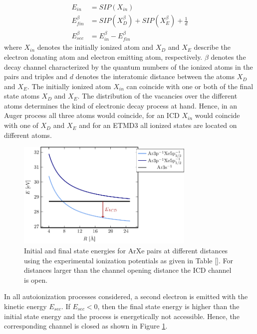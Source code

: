 \begin{align}
 E_{in}        &= SIP(X_{in}) \label{equation:E_in}\\
 E_{fin}^\beta &= SIP(X_{D}^\beta) + SIP(X_{E}^\beta) + \frac 1d
           \label{equation:E_fin}\\
 E_{sec}^\beta &= E_{in}^\beta - E_{fin}^\beta \label{equation:E_sec}
\end{align}
where $X_{in}$ denotes the initially ionized atom and
$X_{D}$ and $X_{E}$ describe the electron donating atom and electron
emitting atom, respectively.
$\beta$ denotes the decay channel characterized
by the quantum numbers of the ionized atoms in the pairs
and triples and $d$ denotes the interatomic distance between the atoms
$X_{D}$ and $X_{E}$. The initially ionized atom $X_{in}$ can
coincide with one or both of
the final state atoms
$X_{D}$ and $X_{E}$.
The distribution of the vacancies over the different
atoms determines the kind of electronic decay process at hand. Hence, in an
Auger process all three atoms would coincide, for an ICD $X_{in}$
would coincide with one of $X_{D}$ and $X_{E}$ and for an {ETMD}3
all ionized states are located on different atoms.

\begin{figure}[h]
 \centering
 \includegraphics[width=8.5cm]{pics/channel_open_ICD.pdf}
 \caption{Initial and final state energies for ArXe pairs at different
          distances using the experimental ionization potentials as given
          in Table \ref{}. For distances larger than the channel opening
          distance the ICD channel is open.}
 \label{figure:channel_open_ICD}
\end{figure}

In all autoionization processes considered, a second electron
is emitted with the kinetic energy $E_{sec}$. If $E_{sec}<0$, then
the final state energy is higher than the initial state energy and the        
process is energetically not accessible. Hence, the corresponding channel     
is closed as shown in Figure \ref{figure:channel_open_ICD}.
                                                               
